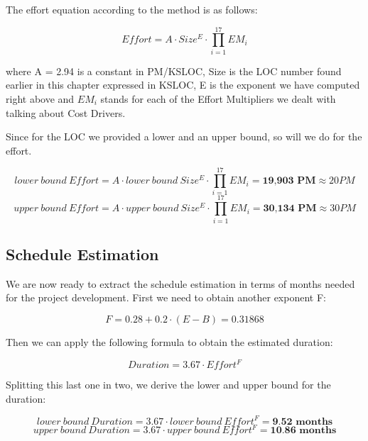 The effort equation according to the method is as follows:

\[ Effort = A \cdot Size^E \cdot \prod_{i=1}^17 EM_i \]

where A = 2.94 is a constant in PM/KSLOC, Size is the LOC number found earlier in this chapter expressed in KSLOC, E is the exponent we have computed right above and \( EM_i \) stands for each of the Effort Multipliers we dealt with talking about Cost Drivers.

Since for the LOC we provided a lower and an upper bound, so will we do for the effort.

\[ lower \> bound \> Effort = A \cdot lower \> bound \> Size^E \cdot \prod_{i=1}^17 EM_i = \textbf{19,903 PM} \approx 20 PM \]
\[ upper \> bound \> Effort = A \cdot upper \> bound \> Size^E \cdot \prod_{i=1}^17 EM_i = \textbf{30,134 PM} \approx 30 PM \]

\subsection{Schedule Estimation}

We are now ready to extract the schedule estimation in terms of months needed for the project development. First we need to obtain another exponent F:

\[ F = 0.28 + 0.2 \cdot (E - B) = 0.31868 \]

Then we can apply the following formula to obtain the estimated duration:

\[ Duration = 3.67 \cdot Effort^F \]

Splitting this last one in two, we derive the lower and upper bound for the duration:

\[ lower \> bound \> Duration = 3.67 \cdot lower \> bound \> Effort^F = \textbf{9.52 months} \]
\[ upper \> bound \> Duration = 3.67 \cdot upper \> bound \> Effort^F = \textbf{10.86 months} \]
